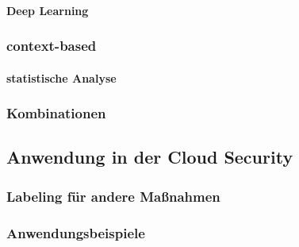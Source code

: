 \paragraph{Deep Learning}


\subsubsection{context-based} \label{k:context}

\paragraph{statistische Analyse}

\subsubsection{Kombinationen} \label{k:kombi}


\subsection{Anwendung in der Cloud Security}

\subsubsection{Labeling für andere Maßnahmen}


\subsubsection{Anwendungsbeispiele}
